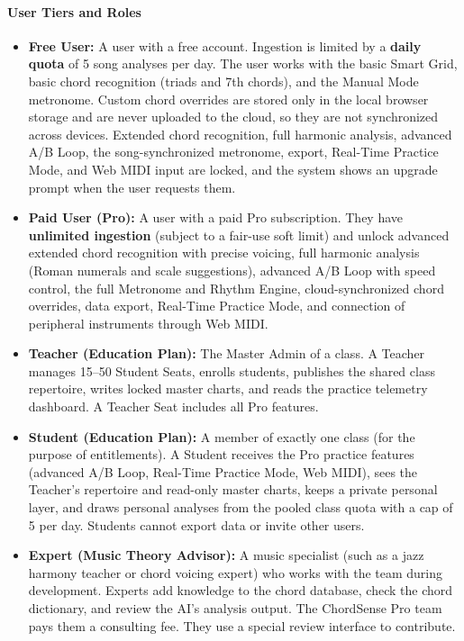 \documentclass[a4paper]{article}
\begin{document}
\paragraph{User Tiers and Roles}
\begin{itemize}
    \item \textbf{Free User:} A user with a free account. Ingestion is limited by a \textbf{daily quota} of 5 song analyses per day. The user works with the basic Smart Grid, basic chord recognition (triads and 7th chords), and the Manual Mode metronome. Custom chord overrides are stored only in the local browser storage and are never uploaded to the cloud, so they are not synchronized across devices. Extended chord recognition, full harmonic analysis, advanced A/B Loop, the song-synchronized metronome, export, Real-Time Practice Mode, and Web MIDI input are locked, and the system shows an upgrade prompt when the user requests them.
    \item \textbf{Paid User (Pro):} A user with a paid Pro subscription. They have \textbf{unlimited ingestion} (subject to a fair-use soft limit) and unlock advanced extended chord recognition with precise voicing, full harmonic analysis (Roman numerals and scale suggestions), advanced A/B Loop with speed control, the full Metronome and Rhythm Engine, cloud-synchronized chord overrides, data export, Real-Time Practice Mode, and connection of peripheral instruments through Web MIDI.
    \item \textbf{Teacher (Education Plan):} The Master Admin of a class. A Teacher manages 15--50 Student Seats, enrolls students, publishes the shared class repertoire, writes locked master charts, and reads the practice telemetry dashboard. A Teacher Seat includes all Pro features.
    \item \textbf{Student (Education Plan):} A member of exactly one class (for the purpose of entitlements). A Student receives the Pro practice features (advanced A/B Loop, Real-Time Practice Mode, Web MIDI), sees the Teacher's repertoire and read-only master charts, keeps a private personal layer, and draws personal analyses from the pooled class quota with a cap of 5 per day. Students cannot export data or invite other users.
    \item \textbf{Expert (Music Theory Advisor):} A music specialist (such as a jazz harmony teacher or chord voicing expert) who works with the team during development. Experts add knowledge to the chord database, check the chord dictionary, and review the AI's analysis output. The ChordSense Pro team pays them a consulting fee. They use a special review interface to contribute.
\end{itemize}
\end{document}
